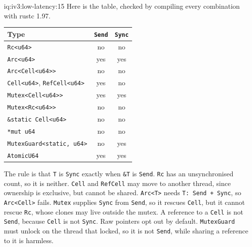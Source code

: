 \begin{solution}{iq:iv3:low-latency:15}
Here is the table, checked by compiling every combination with rustc 1.97.

\begin{center}\small
\begin{tabular}{lcc}
Type & \texttt{Send} & \texttt{Sync}\\\hline
\texttt{Rc<u64>} & no & no\\
\texttt{Arc<u64>} & yes & yes\\
\texttt{Arc<Cell<u64>{}>} & no & no\\
\texttt{Cell<u64>}, \texttt{RefCell<u64>} & yes & no\\
\texttt{Mutex<Cell<u64>{}>} & yes & yes\\
\texttt{Mutex<Rc<u64>{}>} & no & no\\
\texttt{\&\textquotesingle{}static Cell<u64>} & no & no\\
\texttt{*mut u64} & no & no\\
\texttt{MutexGuard<\textquotesingle{}static, u64>} & no & yes\\
\texttt{AtomicU64} & yes & yes
\end{tabular}
\end{center}

The rule is that \texttt{T} is \texttt{Sync} exactly when \texttt{\&T} is \texttt{Send}. \texttt{Rc} has an unsynchronised count, so it is neither. \texttt{Cell} and \texttt{RefCell} may move to another thread, since ownership is exclusive, but cannot be shared. \texttt{Arc<T>} needs \texttt{T: Send + Sync}, so \texttt{Arc<Cell>} fails. \texttt{Mutex} supplies \texttt{Sync} from \texttt{Send}, so it rescues \texttt{Cell}, but it cannot rescue \texttt{Rc}, whose clones may live outside the mutex. A reference to a \texttt{Cell} is not \texttt{Send}, because \texttt{Cell} is not \texttt{Sync}. Raw pointers opt out by default. \texttt{MutexGuard} must unlock on the thread that locked, so it is not \texttt{Send}, while sharing a reference to it is harmless.

\end{solution}

